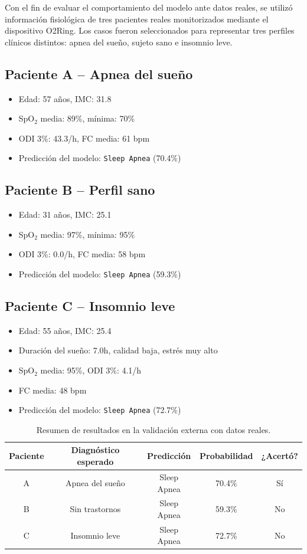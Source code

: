 Con el fin de evaluar el comportamiento del modelo ante datos reales, se utilizó información fisiológica de tres pacientes reales monitorizados mediante el dispositivo O2Ring. Los casos fueron seleccionados para representar tres perfiles clínicos distintos: apnea del sueño, sujeto sano e insomnio leve.

\subsection{Paciente A – Apnea del sueño}
\begin{itemize}
    \item Edad: 57 años, IMC: 31.8
    \item SpO$_2$ media: 89\%, mínima: 70\%
    \item ODI 3\%: 43.3/h, FC media: 61 bpm
    \item Predicción del modelo: \texttt{Sleep Apnea} (70.4\%) 
\end{itemize}

\subsection{Paciente B – Perfil sano}
\begin{itemize}
    \item Edad: 31 años, IMC: 25.1
    \item SpO$_2$ media: 97\%, mínima: 95\%
    \item ODI 3\%: 0.0/h, FC media: 58 bpm
    \item Predicción del modelo: \texttt{Sleep Apnea} (59.3\%) 
\end{itemize}

\subsection{Paciente C – Insomnio leve}
\begin{itemize}
    \item Edad: 55 años, IMC: 25.4
    \item Duración del sueño: 7.0h, calidad baja, estrés muy alto
    \item SpO$_2$ media: 95\%, ODI 3\%: 4.1/h
    \item FC media: 48 bpm
    \item Predicción del modelo: \texttt{Sleep Apnea} (72.7\%) 
\end{itemize}

\begin{table}[H]
\centering
\begin{tabular}{|c|c|c|c|c|}
\hline
\textbf{Paciente} & \textbf{Diagnóstico esperado} & \textbf{Predicción} & \textbf{Probabilidad} & \textbf{¿Acertó?} \\
\hline
A & Apnea del sueño & Sleep Apnea & 70.4\% & Sí \\
B & Sin trastornos & Sleep Apnea & 59.3\% & No \\
C & Insomnio leve & Sleep Apnea & 72.7\% & No \\
\hline
\end{tabular}
\caption{Resumen de resultados en la validación externa con datos reales.}
\end{table}


